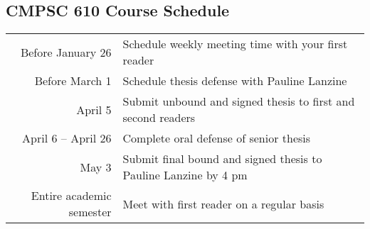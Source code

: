 






\vspace*{-.1in}
\subsection*{CMPSC 610 Course Schedule}

\begin{center}
\begin{tabular}{r|l}
\hline
Before January 26 & Schedule weekly meeting time with your first reader \\
Before March 1 & Schedule thesis defense with Pauline Lanzine \\
April 5 & Submit unbound and signed thesis to first and second readers \\
April 6 -- April 26 & Complete oral defense of senior thesis \\
May 3 & Submit final bound and signed thesis to Pauline Lanzine by 4 pm\\
\hline
Entire academic semester & Meet with first reader on a regular basis \\
\hline
\end{tabular}
\end{center}

